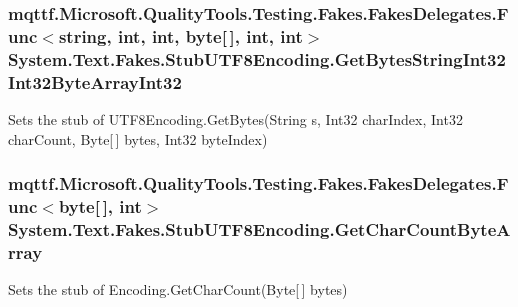 \hypertarget{class_system_1_1_text_1_1_fakes_1_1_stub_u_t_f8_encoding_aa4a15e4f6997718c49b0cdcdfd49a450}{
\subsubsection[{Get\-Bytes\-String\-Int32\-Int32\-Byte\-Array\-Int32}]{\setlength{\rightskip}{0pt plus 5cm}mqttf.\-Microsoft.\-Quality\-Tools.\-Testing.\-Fakes.\-Fakes\-Delegates.\-Func$<$string, int, int, byte\mbox{[}$\,$\mbox{]}, int, int$>$ System.\-Text.\-Fakes.\-Stub\-U\-T\-F8\-Encoding.\-Get\-Bytes\-String\-Int32\-Int32\-Byte\-Array\-Int32}}\label{class_system_1_1_text_1_1_fakes_1_1_stub_u_t_f8_encoding_aa4a15e4f6997718c49b0cdcdfd49a450}


Sets the stub of U\-T\-F8\-Encoding.\-Get\-Bytes(\-String s, Int32 char\-Index, Int32 char\-Count, Byte\mbox{[}$\,$\mbox{]} bytes, Int32 byte\-Index)

\hypertarget{class_system_1_1_text_1_1_fakes_1_1_stub_u_t_f8_encoding_a33f20dc66d826ed222df97d950d79c1f}{
\subsubsection[{Get\-Char\-Count\-Byte\-Array}]{\setlength{\rightskip}{0pt plus 5cm}mqttf.\-Microsoft.\-Quality\-Tools.\-Testing.\-Fakes.\-Fakes\-Delegates.\-Func$<$byte\mbox{[}$\,$\mbox{]}, int$>$ System.\-Text.\-Fakes.\-Stub\-U\-T\-F8\-Encoding.\-Get\-Char\-Count\-Byte\-Array}}\label{class_system_1_1_text_1_1_fakes_1_1_stub_u_t_f8_encoding_a33f20dc66d826ed222df97d950d79c1f}


Sets the stub of Encoding.\-Get\-Char\-Count(\-Byte\mbox{[}$\,$\mbox{]} bytes)

